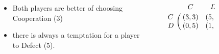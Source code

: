 \documentclass[usenames,dvipsnames,t]{beamer}
\begin{document}
\begin{columns}
    \begin{column}{.1\linewidth}
    \end{column}
    \begin{column}{.2\linewidth}
        \vspace{1.1cm}

        \begin{itemize}
            \item Both players are better of choosing Cooperation (3)
            \item there is always a temptation for a player to Defect (5).
        \end{itemize}
    \end{column}
    \begin{column}{.09\linewidth}
    \end{column}
    \begin{column}{.17\linewidth}
        \vspace{0.1cm}

        \large{
        \begin{equation}\label{eq:payoff_matrix}
             \bordermatrix{~ & C & D \cr
                              C & (3, 3) & (5, 0) \cr
                              D & (0, 5) & (1, 1) \cr}
            \end{equation}}
    \end{column}
    \begin{column}{.09\linewidth}
    \end{column}
    \begin{column}{.3\linewidth}
        \begin{center}
            
        \end{center}
    \end{column}
    \begin{column}{.1\linewidth}
    \end{column}
\end{columns}
\vspace{0.3cm}
\end{document}
